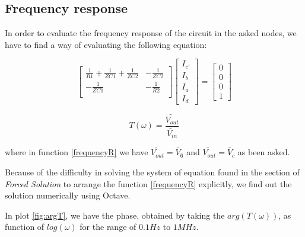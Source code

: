 \subsection{Frequency response}

In order to evaluate the frequency response of the circuit in the asked nodes, we have to find a way of evaluating the following equation:


\[
  \begin{bmatrix}
    \frac{1}{R1} + \frac{1}{ZC1} + \frac{1}{ZC2} & -\frac{1}{ZC2} \\
    -\frac{1}{ZC1}                               & -\frac{1}{R2}  \\
  \end{bmatrix}
  \begin{bmatrix}
    I_{c'} \\ I_b \\ I_a \\ I_d
  \end{bmatrix}
  =
  \begin{bmatrix}
    0 \\ 0 \\ 0 \\ 1
  \end{bmatrix}
\]

\hfill


\begin{equation}
  T(\omega) = \frac{\widetilde{V_{out}}}{\widetilde{V_{in}}}
  \label{frequencyR}
\end{equation}

where in function \ref{frequencyR} we have $\widetilde{V_{out}} = \tilde{V_6}$ and $\widetilde{V_{out}} = \tilde{V_c}$ as been asked.

Because of the difficulty in solving the system of equation found in the section of \textit{Forced Solution} to arrange the function \ref{frequencyR} explicitly, we find out the solution numerically using Octave.

In plot \ref{fig:argT}, we have the phase, obtained by taking the $arg(T(\omega))$, as function of $log(\omega)$ for the range of $0.1Hz$ to $1MHz$.

